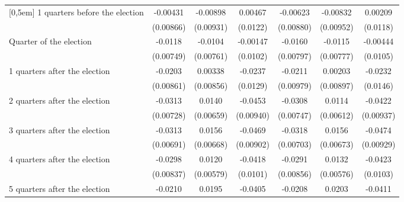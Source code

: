 \begin{table}[!ht]
\begin{tabular}{l*{6}{c}}
[0,5em]
 1 quarters before the election&    -0.00431         &    -0.00898         &     0.00467         &    -0.00623         &    -0.00832         &     0.00209         \\
                    &   (0.00866)         &   (0.00931)         &    (0.0122)         &   (0.00880)         &   (0.00952)         &    (0.0118)         \\
[0,5em]
Quarter of the election&     -0.0118         &     -0.0104         &    -0.00147         &     -0.0160\sym{*}  &     -0.0115         &    -0.00444         \\
                    &   (0.00749)         &   (0.00761)         &    (0.0102)         &   (0.00797)         &   (0.00777)         &    (0.0105)         \\
[0,5em]
 1 quarters after the election&     -0.0203\sym{*}  &     0.00338         &     -0.0237         &     -0.0211\sym{*}  &     0.00203         &     -0.0232         \\
                    &   (0.00861)         &   (0.00856)         &    (0.0129)         &   (0.00979)         &   (0.00897)         &    (0.0146)         \\
[0,5em]
 2 quarters after the election&     -0.0313\sym{***}&      0.0140\sym{*}  &     -0.0453\sym{***}&     -0.0308\sym{***}&      0.0114         &     -0.0422\sym{***}\\
                    &   (0.00728)         &   (0.00659)         &   (0.00940)         &   (0.00747)         &   (0.00612)         &   (0.00937)         \\
[0,5em]
 3 quarters after the election&     -0.0313\sym{***}&      0.0156\sym{*}  &     -0.0469\sym{***}&     -0.0318\sym{***}&      0.0156\sym{*}  &     -0.0474\sym{***}\\
                    &   (0.00691)         &   (0.00668)         &   (0.00902)         &   (0.00703)         &   (0.00673)         &   (0.00929)         \\
[0,5em]
 4 quarters after the election&     -0.0298\sym{***}&      0.0120\sym{*}  &     -0.0418\sym{***}&     -0.0291\sym{***}&      0.0132\sym{*}  &     -0.0423\sym{***}\\
                    &   (0.00837)         &   (0.00579)         &    (0.0101)         &   (0.00856)         &   (0.00576)         &    (0.0103)         \\
[0,5em]
 5 quarters after the election&     -0.0210\sym{**} &      0.0195         &     -0.0405\sym{**} &     -0.0208\sym{**} &      0.0203\sym{*}  &     -0.0411\sym{**} \\

\end{tabular}
\end{table}
